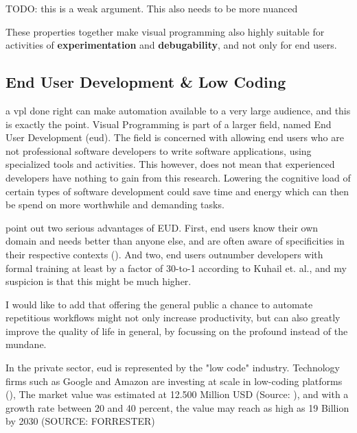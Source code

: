 \begin{note}
  TODO: this is a weak argument. This also needs to be more nuanced
\end{note}


These properties together make visual programming also highly suitable for activities of \textbf{experimentation} and \textbf{debugability}, and not only for end users. 


\subsection{End User Development \& Low Coding}
a \ac{vpl} done right can make automation available to a very large audience, and this is exactly the point. 
Visual Programming is part of a larger field, named End User Development (eud). 
The field is concerned with allowing end users who are not professional software developers to write software applications, using specialized tools and activities. 
This however, does not mean that experienced developers have nothing to gain from this research. 
Lowering the cognitive load of certain types of software development could save time and energy which can then be spend on more worthwhile and demanding tasks. 

\cite{kuhail_characterizing_2021} point out two serious advantages of EUD. 
First, end users know their own domain and needs better than anyone else, and are often aware of specificities in their respective contexts (\cite{kuhail_characterizing_2021}). 
And two, end users outnumber developers with formal training at least by a factor of 30-to-1 according to Kuhail et. al., and my suspicion is that this might be much higher.

I would like to add that offering the general public a chance to automate repetitious workflows might not only increase productivity, but can also greatly improve the quality of life in general, by focussing on the profound instead of the mundane. 

In the private sector, \ac{eud} is represented by the "low code" industry. 
Technology firms such as Google and Amazon are investing at scale in low-coding platforms (\cite{kuhail_characterizing_2021}),
The market value was estimated at 12.500 Million USD (Source: ), and with a growth rate between 20 and 40 percent, the value may reach as high as 19 Billion by 2030 (SOURCE: FORRESTER) 


